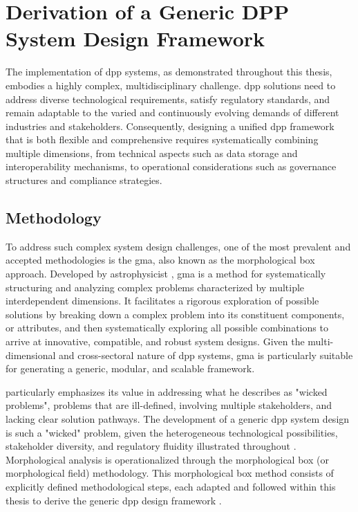 \section{Derivation of a Generic DPP System Design Framework}
\label{sec:generic_system_design_model}

The implementation of \acrlong{dpp} systems, as demonstrated throughout this thesis, embodies a highly complex, multidisciplinary challenge. \ac{dpp} solutions need to address diverse technological requirements, satisfy regulatory standards, and remain adaptable to the varied and continuously evolving demands of different industries and stakeholders. Consequently, designing a unified \ac{dpp} framework that is both flexible and comprehensive requires systematically combining multiple dimensions, from technical aspects such as data storage and interoperability mechanisms, to operational considerations such as governance structures and compliance strategies.

\subsection{Methodology}

To address such complex system design challenges, one of the most prevalent and accepted methodologies is the \ac{gma}, also known as the morphological box approach. Developed by astrophysicist \textcite{Zwicky.1969}, \ac{gma} is a method for systematically structuring and analyzing complex problems characterized by multiple interdependent dimensions. It facilitates a rigorous exploration of possible solutions by breaking down a complex problem into its constituent components, or attributes, and then systematically exploring all possible combinations to arrive at innovative, compatible, and robust system designs. Given the multi-dimensional and cross-sectoral nature of \ac{dpp} systems, \ac{gma} is particularly suitable for generating a generic, modular, and scalable framework. \autocite{Zwicky.1969, Ritchey.2011}

\textcite{Ritchey.2011} particularly emphasizes its value in addressing what he describes as "wicked problems", problems that are ill-defined, involving multiple stakeholders, and lacking clear solution pathways. The development of a generic \ac{dpp} system design is such a "wicked" problem, given the heterogeneous technological possibilities, stakeholder diversity, and regulatory fluidity illustrated throughout . Morphological analysis is operationalized through the morphological box (or morphological field) methodology. This morphological box method consists of explicitly defined methodological steps, each adapted and followed within this thesis to derive the generic \ac{dpp} design framework \autocite{Ritchey.2011}.

